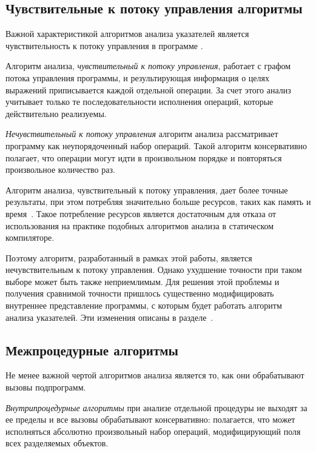 \documentclass[14pt,titlepage,draft]{extarticle}
\begin{document}
  \subsection{Чувствительные к потоку управления алгоритмы}

    Важной характеристикой алгоритмов анализа указателей является
    чувствительность к потоку управления в программе
    .

    Алгоритм анализа, \emph{чувствительный к потоку управления}, работает с
    графом потока управления программы, и результирующая информация о целях
    выражений приписывается каждой отдельной операции. За счет этого анализ
    учитывает только те последовательности исполнения операций, которые
    действительно реализуемы.

    \emph{Нечувствительный к потоку управления} алгоритм анализа рассматривает
    программу как неупорядоченный набор операций. Такой алгоритм
    консервативно полагает, что операции могут идти в произвольном порядке и
    повторяться произвольное количество раз.

    Алгоритм анализа, чувствительный к потоку управления, дает более точные
    результаты, при этом потребляя значительно больше ресурсов, таких как
    память и время~\cite[раздел.~4.4]{hind_pointer_analysis_not_solved_yet}.
    Такое потребление ресурсов является достаточным для отказа от
    использования на практике подобных алгоритмов анализа в статическом
    компиляторе.

    Поэтому алгоритм, разработанный в рамках этой работы, является
    нечувствительным к потоку управления. Однако ухудшение точности при таком
    выборе может быть также неприемлимым.
    Для решения этой проблемы и получения сравнимой точности пришлось
    существенно модифицировать внутреннее представление программы, с которым
    будет работать алгоритм анализа указателей. Эти изменения описаны в
    разделе~\todoref.

  \subsection{Межпроцедурные алгоритмы}

    Не менее важной чертой алгоритмов анализа является то, как они
    обрабатывают вызовы подпрограмм.

    \emph{Внутрипроцедурные алгоритмы} при анализе отдельной процедуры не
    выходят за ее пределы и все вызовы обрабатывают консервативно: полагается,
    что может исполняться абсолютно произвольный набор операций, модифицирующий
    поля всех разделяемых объектов.
\end{document}
